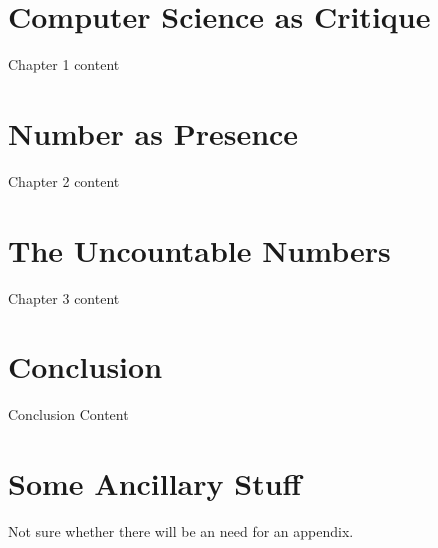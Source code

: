 \documentclass[11pt]{ucscthesis}
\begin{document}
\chapter{Computer Science as Critique}

Chapter 1 content

\chapter{Number as Presence}

Chapter 2 content

\chapter{The Uncountable Numbers}

Chapter 3 content

\chapter{Conclusion}
Conclusion Content

\appendix
\chapter{Some Ancillary Stuff}

Not sure whether there will be an need for an appendix.



\def\baselinestretch{1.0}\large\normalsize



\end{document}
